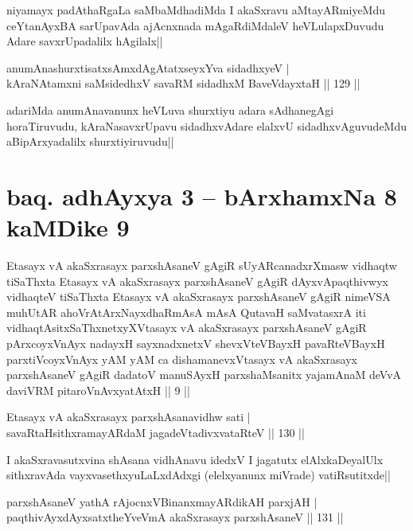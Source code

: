 \begin{artha}%
niyamayx padAthaRgaLa saMbaMdhadiMda I akaSxravu aMtayARmiyeMdu ceYtanAyxBA sarUpavAda ajAcnxnada mAgaRdiMdaleV heVLulapxDuvudu Adare savxrUpadalilx hAgilalx||
\end{artha}

\begin{shl}
anumAnashurxtisatxsAmxdAgAtatxseyxYva sidadhxyeV |\\
kAraNAtamxni saMsidedhxV savaRM sidadhxM BaveVdayxtaH \hfill || 129 ||
\end{shl}

\begin{artha}
adariMda anumAnavanunx heVLuva shurxtiyu adara sAdhanegAgi horaTiruvudu, kAraNasavxrUpavu sidadhxvAdare elalxvU sidadhxvAguvudeMdu aBipArxyadalilx shurxtiyiruvudu||
\end{artha}

\section*{baq. adhAyxya 3 -- bArxhamxNa 8 kaMDike 9}


\begin{shl}
Etasayx vA akaSxrasayx parxshAsaneV gAgiR sUyARcanadxrXmasw vidhaqtw tiSaThxta Etasayx vA akaSxrasayx parxshAsaneV gAgiR dAyxvApaqthivwyx vidhaqteV tiSaThxta Etasayx vA akaSxrasayx parxshAsaneV gAgiR nimeVSA muhUtAR ahoVrAtArxNayxdhaRmAsA mAsA QutavaH saMvatasxrA iti vidhaqtAsitxSaThxnetxyXVtasayx vA akaSxrasayx parxshAsaneV gAgiR pArxcoyxV\s nAyx nadayxH sayxnadxnetxV shevxVteVBayxH pavaRteVBayxH parxtiVcoyxV\s nAyx yAM yAM ca dishamanevxVtasayx vA akaSxrasayx parxshAsaneV gAgiR dadatoV manuSAyxH parxshaMsanitx yajamAnaM deVvA daviVRM pitaroV\s nAvxyatAtxH || 9 ||
\end{shl}

\begin{shl}
Etasayx vA akaSxrasayx parxshAsanavidhw sati |\\
savaRtaHsithxramayARdaM jagadeVtadivxvataRteV \hfill || 130 ||
\end{shl}

\begin{artha}%
I akaSxravasutxvina shAsana vidhAnavu idedxV I jagatutx elAlxkaDeyalUlx sithxravAda vayxvasethxyuLaLxdAdxgi (elelxyanunx miVrade) vatiRsutitxde||
\end{artha}

\begin{shl}
parxshAsaneV yathA rAjocnxV\s BinanxmayARdikAH parxjAH |\\
paqthivAyxdAyxsatxtheYveVmA akaSxrasayx parxshAsaneV \hfill || 131 ||
\end{shl}

